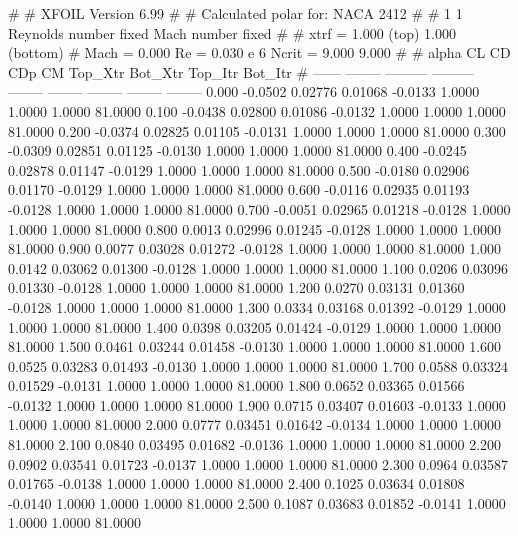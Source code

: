 #  
#       XFOIL         Version 6.99
#  
# Calculated polar for: NACA 2412                                       
#  
# 1 1 Reynolds number fixed          Mach number fixed         
#  
# xtrf =   1.000 (top)        1.000 (bottom)  
# Mach =   0.000     Re =     0.030 e 6     Ncrit =   9.000  9.000
#  
#   alpha    CL        CD       CDp       CM     Top_Xtr  Bot_Xtr  Top_Itr  Bot_Itr
#  ------ -------- --------- --------- -------- -------- -------- -------- --------
   0.000  -0.0502   0.02776   0.01068  -0.0133   1.0000   1.0000   1.0000  81.0000
   0.100  -0.0438   0.02800   0.01086  -0.0132   1.0000   1.0000   1.0000  81.0000
   0.200  -0.0374   0.02825   0.01105  -0.0131   1.0000   1.0000   1.0000  81.0000
   0.300  -0.0309   0.02851   0.01125  -0.0130   1.0000   1.0000   1.0000  81.0000
   0.400  -0.0245   0.02878   0.01147  -0.0129   1.0000   1.0000   1.0000  81.0000
   0.500  -0.0180   0.02906   0.01170  -0.0129   1.0000   1.0000   1.0000  81.0000
   0.600  -0.0116   0.02935   0.01193  -0.0128   1.0000   1.0000   1.0000  81.0000
   0.700  -0.0051   0.02965   0.01218  -0.0128   1.0000   1.0000   1.0000  81.0000
   0.800   0.0013   0.02996   0.01245  -0.0128   1.0000   1.0000   1.0000  81.0000
   0.900   0.0077   0.03028   0.01272  -0.0128   1.0000   1.0000   1.0000  81.0000
   1.000   0.0142   0.03062   0.01300  -0.0128   1.0000   1.0000   1.0000  81.0000
   1.100   0.0206   0.03096   0.01330  -0.0128   1.0000   1.0000   1.0000  81.0000
   1.200   0.0270   0.03131   0.01360  -0.0128   1.0000   1.0000   1.0000  81.0000
   1.300   0.0334   0.03168   0.01392  -0.0129   1.0000   1.0000   1.0000  81.0000
   1.400   0.0398   0.03205   0.01424  -0.0129   1.0000   1.0000   1.0000  81.0000
   1.500   0.0461   0.03244   0.01458  -0.0130   1.0000   1.0000   1.0000  81.0000
   1.600   0.0525   0.03283   0.01493  -0.0130   1.0000   1.0000   1.0000  81.0000
   1.700   0.0588   0.03324   0.01529  -0.0131   1.0000   1.0000   1.0000  81.0000
   1.800   0.0652   0.03365   0.01566  -0.0132   1.0000   1.0000   1.0000  81.0000
   1.900   0.0715   0.03407   0.01603  -0.0133   1.0000   1.0000   1.0000  81.0000
   2.000   0.0777   0.03451   0.01642  -0.0134   1.0000   1.0000   1.0000  81.0000
   2.100   0.0840   0.03495   0.01682  -0.0136   1.0000   1.0000   1.0000  81.0000
   2.200   0.0902   0.03541   0.01723  -0.0137   1.0000   1.0000   1.0000  81.0000
   2.300   0.0964   0.03587   0.01765  -0.0138   1.0000   1.0000   1.0000  81.0000
   2.400   0.1025   0.03634   0.01808  -0.0140   1.0000   1.0000   1.0000  81.0000
   2.500   0.1087   0.03683   0.01852  -0.0141   1.0000   1.0000   1.0000  81.0000
